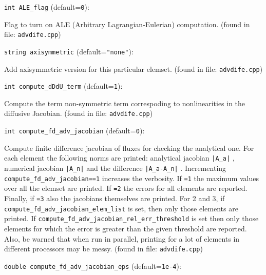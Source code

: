 \item\verb+int ALE_flag+ {\rm(default=\verb|0|)}:

Flag to turn on ALE (Arbitrary Lagrangian-Eulerian) computation. 
 (found in file: \verb+advdife.cpp+)
\item\verb+string axisymmetric+ {\rm(default=\verb|"none"|)}:

Add axisymmetric version for this particular elemset.
 (found in file: \verb+advdife.cpp+)
\item\verb+int compute_dDdU_term+ {\rm(default=\verb|1|)}:

Compute the term non-symmetric term
 correspoding to nonlinearities in the
 diffusive Jacobian.
 (found in file: \verb+advdife.cpp+)
\item\verb+int compute_fd_adv_jacobian+ {\rm(default=\verb|0|)}:

Compute finite difference jacobian of fluxes for checking the
 analytical one. For each element the following norms are printed:
 analytical jacobian \verb+|A_a|+ , numerical jacobian \verb+|A_n|+ and the
 difference \verb+|A_a-A_n|+ . Incrementing \verb+compute_fd_adv_jacobian==1+
 increases the verbosity. If \verb+=1+ the maximum values over all the
 elemset are printed. If \verb+=2+ the errors for all elements are
 reported. Finally, if \verb+=3+ also the jacobians themselves are
 printed. For 2 and 3, if \verb+compute_fd_adv_jacobian_elem_list+ is
 set, then only those elements are printed. If
 \verb+compute_fd_adv_jacobian_rel_err_threshold+ is set then only those
 elements for which the error is greater than the given threshold
 are reported.  Also, be warned that when run in parallel, printing
 for a lot of elements in different processors may be messy.
 (found in file: \verb+advdife.cpp+)
\item\verb+double compute_fd_adv_jacobian_eps+ {\rm(default=\verb|1e-4|)}:

